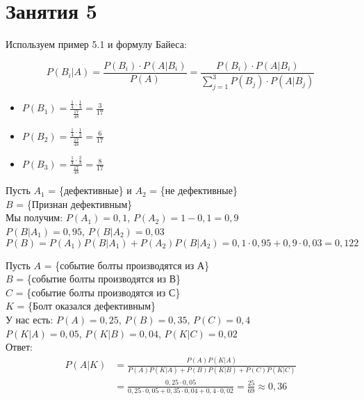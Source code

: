 \section*{Занятия 5}

\begin{exercise}[1]
	Используем пример 5.1 и формулу Байеса:
	
	\[P(B_i | A) = \frac{P(B_i) \cdot P(A | B_i)}{P(A)} = \frac{P(B_i) \cdot P(A | B_i)}{\sum_{j=1}^{3} P(B_j) \cdot P(A | B_j)}\]
	\begin{itemize}
		\item $P(B_1) = \frac{\frac{1}{4} \cdot \frac{1}{4}}{\frac{17}{48}} = \frac{3}{17}$
		\item $P(B_2) = \frac{\frac{1}{4} \cdot \frac{1}{2}}{\frac{17}{48}} = \frac{6}{17}$
		\item $P(B_3) = \frac{\frac{1}{4} \cdot \frac{2}{3}}{\frac{17}{48}} = \frac{8}{17}$
	\end{itemize}
\end{exercise}

\begin{exercise}[3]
	Пусть $A_1$ = \{дефективные\} и $A_2$ = \{не дефективные\} \\ $B$ = \{Признан дефективным\} \\ Мы получим: $P(A_1) = 0,1$, $P(A_2) = 1-0,1=0,9$ \\ $P(B | A_1) = 0,95$, $P(B | A_2) = 0,03$ \\ $P(B) = P(A_1) P(B | A_1) + P(A_2) P(B | A_2) = 0,1 \cdot 0,95 + 0,9 \cdot 0,03 = 0,122$
\end{exercise}

\begin{exercise}[4]
	Пусть $A$ = \{событие болты производятся из А\} \\ $B$ = \{событие болты производятся из В\} \\ $C$ = \{событие болты производятся из С\} \\ $K$ = \{Болт оказался дефективным\} \\ У нас есть: $P(A) = 0,25$, $P(B) = 0,35$, $P(C) = 0,4$ \\ $P(K|A) = 0,05$, $P(K|B) = 0,04$, $P(K|C) = 0,02$ \\ Ответ: 
	\begin{align*}
		P(A|K) & = \frac{P(A) P(K|A)}{P(A)P(K|A)+P(B)P(K|B)+P(C)P(K|C)} \\ & = \frac{0,25 \cdot 0,05}{0,25 \cdot 0,05 + 0,35 \cdot 0,04 + 0,4 \cdot 0,02} = \frac{25}{69} \approx 0,36
	\end{align*}
\end{exercise}

